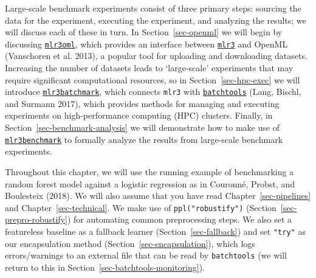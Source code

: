 Large-scale benchmark experiments consist of three primary steps:
sourcing the data for the experiment, executing the experiment, and
analyzing the results; we will discuss each of these in turn. In
Section~\ref{sec-openml} we will begin by discussing
\href{https://mlr3oml.mlr-org.com}{\texttt{mlr3oml}}, which provides an
interface between
\href{https://mlr3.mlr-org.com}{\texttt{mlr3}} and
OpenML (Vanschoren et al. 2013), a popular tool for uploading and
downloading datasets. Increasing the number of datasets leads to
`large-scale' experiments that may require significant computational
resources, so in Section~\ref{sec-hpc-exec} we will introduce
\href{https://mlr3batchmark.mlr-org.com}{\texttt{mlr3batchmark}}, which
connects \texttt{mlr3} with
\href{https://cran.r-project.org/package=batchtools}{\texttt{batchtools}}
(Lang, Bischl, and Surmann 2017), which provides methods for managing
and executing experiments on high-performance
computing (HPC) clusters. Finally, in
Section~\ref{sec-benchmark-analysis} we will demonstrate how to make use
of \href{https://mlr3benchmark.mlr-org.com}{\texttt{mlr3benchmark}} to
formally analyze the results from large-scale benchmark experiments.

Throughout this chapter, we will use the running example of benchmarking
a random forest model against a logistic regression as in Couronné,
Probst, and Boulesteix (2018). We will also assume that you have read
Chapter~\ref{sec-pipelines} and Chapter~\ref{sec-technical}. We make use
of \texttt{ppl("robustify")} (Section~\ref{sec-prepro-robustify}) for
automating common preprocessing steps. We also set a featureless
baseline as a fallback learner (Section~\ref{sec-fallback}) and set
\texttt{"try"} as our encapsulation method
(Section~\ref{sec-encapsulation}), which logs errors/warnings to an
external file that can be read by \texttt{batchtools} (we will return to
this in Section~\ref{sec-batchtools-monitoring}).

